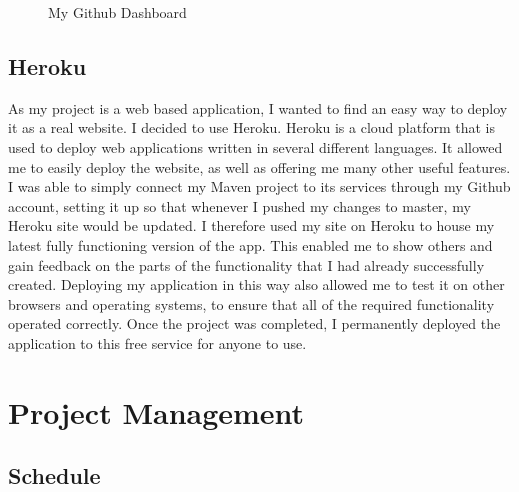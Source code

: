 \begin{figure}[!ht]
	\centering
	\caption{My Github Dashboard}
\end{figure}

\subsection{Heroku\label{heroku}}
As my project is a web based application, I wanted to find an easy way to deploy it as a real website. I decided to use Heroku. Heroku is a cloud platform that is used to deploy web applications written in several different languages. It allowed me to easily deploy the website, as well as offering me many other useful features. I was able to simply connect my Maven project to its services through my Github account, setting it up so that whenever I pushed my changes to master, my Heroku site would be updated. I therefore used my site on Heroku to house my latest fully functioning version of the app. This enabled me to show others and gain feedback on the parts of the functionality that I had already successfully created. Deploying my application in this way also allowed me to test it on other browsers and operating systems, to ensure that all of the required functionality operated correctly. Once the project was completed, I permanently deployed the application to this free service for anyone to use.

\pagebreak

\section{Project Management}

\subsection{Schedule \label{schedule}}

